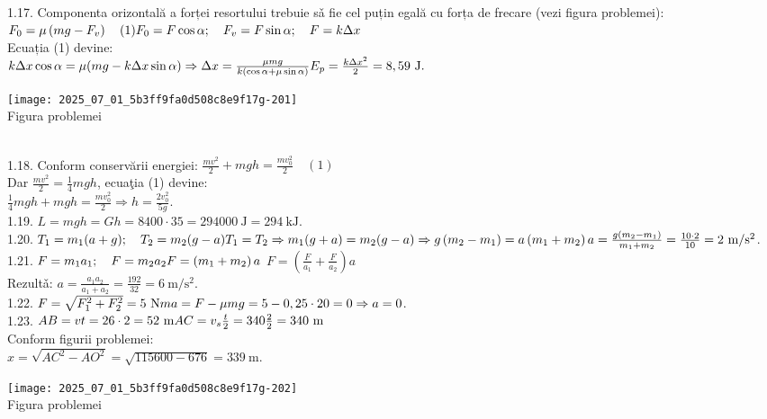 1.17. Componenta orizontală a forței resortului trebuie sǎ fie cel puțin egală cu forța de frecare (vezi figura problemei): $F_{0}=\mu\left(m g-F_{v}\right) \quad(1)\\ F_{0}=F \cos \alpha ; \quad F_{v}=F \sin \alpha ; \quad F=k \Delta x$\\ Ecuația (1) devine:\\ $k \Delta x \cos \alpha=\mu(m g-k \Delta x \sin \alpha) \Rightarrow \Delta x=\frac{\mu m g}{k(\cos \alpha+\mu \sin \alpha)}\\ E_{p}=\frac{k \Delta x^{2}}{2}=8,59 \mathrm{~J}.$\\ \begin{center} \texttt{[image: 2025\_07\_01\_5b3ff9fa0d508c8e9f17g-201]}\\ Figura problemei \end{center}\\

1.18. Conform conservării energiei: $\frac{m v^{2}}{2}+m g h=\frac{m v_{0}^{2}}{2} \quad(1)$\\ Dar $\frac{m v^{2}}{2}=\frac{1}{4} m g h$, ecuaţia (1) devine:\\ $\frac{1}{4} m g h+m g h=\frac{m v_{0}^{2}}{2} \Rightarrow h=\frac{2 v_{0}^{2}}{5 g}$.\\

1.19. $L=m g h=G h=8400 \cdot 35=294000 \mathrm{~J}=294 \mathrm{~kJ}$.\\

1.20. $T_{1}=m_{1}(a+g); \quad T_{2}=m_{2}(g-a)\\ T_{1}=T_{2} \Rightarrow m_{1}(g+a)=m_{2}(g-a) \Rightarrow g\left(m_{2}-m_{1}\right)=a\left(m_{1}+m_{2}\right)\\ a=\frac{g\left(m_{2}-m_{1}\right)}{m_{1}+m_{2}}=\frac{10 \cdot 2}{10}=2 \mathrm{~m} / \mathrm{s}^{2}$.\\

1.21. $F=m_{1} a_{1}; \quad F=m_{2} a_{2}\\ F=\left(m_{1}+m_{2}\right) a$  $F=\left(\frac{F}{a_{1}}+\frac{F}{a_{2}}\right) a$\\ Rezultǎ: $a=\frac{a_{1} a_{2}}{a_{1}+a_{2}}=\frac{192}{32}=6 \mathrm{~m} / \mathrm{s}^{2}$.\\

1.22. $F=\sqrt{F_{1}^{2}+F_{2}^{2}}=5 \mathrm{~N}\\ m a=F-\mu m g=5-0,25 \cdot 20=0 \Rightarrow a=0$.\\

1.23. $A B=v t=26 \cdot 2=52 \mathrm{~m}\\ A C=v_{s} \frac{t}{2}=340 \frac{2}{2}=340 \mathrm{~m}$\\ Conform figurii problemei:\\ $x=\sqrt{A C^{2}-A O^{2}}=\sqrt{115600-676}=339 \mathrm{~m}$.\\ \begin{center} \texttt{[image: 2025\_07\_01\_5b3ff9fa0d508c8e9f17g-202]}\\ Figura problemei \end{center}\\

